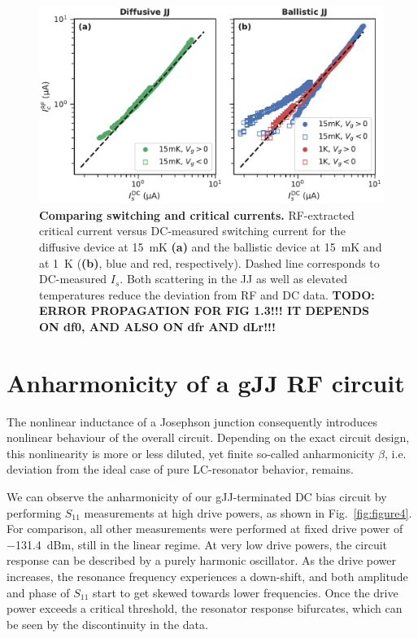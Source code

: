 \begin{figure}
	\centering
	\includegraphics[width=0.583\linewidth]{chapter-gJJ-CPR/figs/Figure3}
	\caption{
		\textbf{Comparing switching and critical currents.}
		RF-extracted critical current versus DC-measured switching current for the diffusive device at \SI{15}{\milli\kelvin} \textbf{(a)} and the ballistic device at \SI{15}{\milli\kelvin} and at \SI{1}{\kelvin} (\textbf{(b)}, blue and red, respectively).
		Dashed line corresponds to DC-measured $I_s$.
		Both scattering in the JJ as well as elevated temperatures reduce the deviation from RF and DC data.
		\textbf{TODO: ERROR PROPAGATION FOR FIG 1.3!!! IT DEPENDS ON df0, AND ALSO ON dfr AND dLr!!!}
	}
	\label{fig:figure3}
\end{figure}

\section{Anharmonicity of a gJJ RF circuit}

The nonlinear inductance of a Josephson junction consequently introduces nonlinear behaviour of the overall circuit.
%
Depending on the exact circuit design, this nonlinearity is more or less diluted, yet finite so-called anharmonicity $\beta$, i.e. deviation from the ideal case of pure LC-resonator behavior, remains.

We can observe the anharmonicity of our gJJ-terminated DC bias circuit by performing $S_{11}$ measurements at high drive powers, as shown in Fig.~\ref{fig:figure4}.
%
For comparison, all other measurements were performed at fixed drive power of \SI{-131.4}{dBm}, still in the linear regime.
%
At very low drive powers, the circuit response can be described by a purely harmonic oscillator.
%
As the drive power increases, the resonance frequency experiences a down-shift, and both amplitude and phase of $S_{11}$ start to get skewed towards lower frequencies.
%
Once the drive power exceeds a critical threshold, the resonator response bifurcates, which can be seen by the discontinuity in the data.


